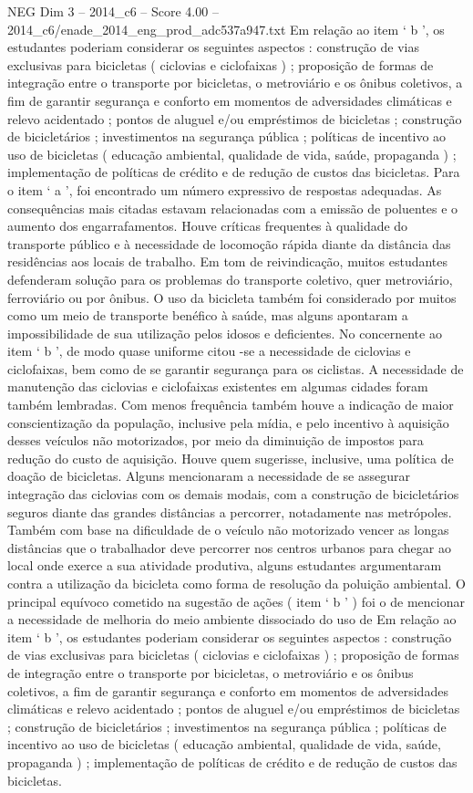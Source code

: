 \begin{textsample}{NEG Dim 3 – 2014\_c6 – Score 4.00 – 2014\_c6/enade\_2014\_eng\_prod\_adc537a947.txt}
Em relação ao item ‘ b ’, os estudantes poderiam considerar os seguintes aspectos : construção de vias exclusivas para bicicletas ( ciclovias e ciclofaixas ) ; proposição de formas de integração entre o transporte por bicicletas, o metroviário e os ônibus coletivos, a fim de garantir segurança e conforto em momentos de adversidades climáticas e relevo acidentado ; pontos de aluguel e/ou empréstimos de bicicletas ; construção de bicicletários ; investimentos na segurança pública ; políticas de incentivo ao uso de bicicletas ( educação ambiental, qualidade de vida, saúde, propaganda ) ; implementação de políticas de crédito e de redução de custos das bicicletas.
Para o item ‘ a ’, foi encontrado um número expressivo de respostas adequadas.
As consequências mais citadas estavam relacionadas com a emissão de poluentes e o aumento dos engarrafamentos.
Houve críticas frequentes à qualidade do transporte público e à necessidade de locomoção rápida diante da distância das residências aos locais de trabalho.
Em tom de reivindicação, muitos estudantes defenderam solução para os problemas do transporte coletivo, quer metroviário, ferroviário ou por ônibus.
O uso da bicicleta também foi considerado por muitos como um meio de transporte benéfico à saúde, mas alguns apontaram a impossibilidade de sua utilização pelos idosos e deficientes.
No concernente ao item ‘ b ’, de modo quase uniforme citou -se a necessidade de ciclovias e ciclofaixas, bem como de se garantir segurança para os ciclistas.
A necessidade de manutenção das ciclovias e ciclofaixas existentes em algumas cidades foram também lembradas.
Com menos frequência também houve a indicação de maior conscientização da população, inclusive pela mídia, e pelo incentivo à aquisição desses veículos não motorizados, por meio da diminuição de impostos para redução do custo de aquisição.
Houve quem sugerisse, inclusive, uma política de doação de bicicletas.
Alguns mencionaram a necessidade de se assegurar integração das ciclovias com os demais modais, com a construção de bicicletários seguros diante das grandes distâncias a percorrer, notadamente nas metrópoles.
Também com base na dificuldade de o veículo não motorizado vencer as longas distâncias que o trabalhador deve percorrer nos centros urbanos para chegar ao local onde exerce a sua atividade produtiva, alguns estudantes argumentaram contra a utilização da bicicleta como forma de resolução da poluição ambiental.
O principal equívoco cometido na sugestão de ações ( item ‘ b ’ ) foi o de mencionar a necessidade de melhoria do meio ambiente dissociado do uso de Em relação ao item ‘ b ’, os estudantes poderiam considerar os seguintes aspectos : construção de vias exclusivas para bicicletas ( ciclovias e ciclofaixas ) ; proposição de formas de integração entre o transporte por bicicletas, o metroviário e os ônibus coletivos, a fim de garantir segurança e conforto em momentos de adversidades climáticas e relevo acidentado ; pontos de aluguel e/ou empréstimos de bicicletas ; construção de bicicletários ; investimentos na segurança pública ; políticas de incentivo ao uso de bicicletas ( educação ambiental, qualidade de vida, saúde, propaganda ) ; implementação de políticas de crédito e de redução de custos das bicicletas.

\end{textsample}

